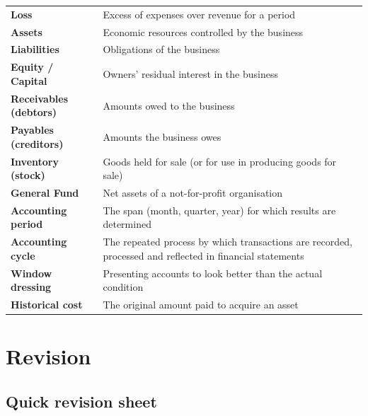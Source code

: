 \documentclass[11pt,a4paper]{article}
\begin{document}
\begin{center}
\begin{tabularx}{\textwidth}{@{}l Y@{}}
\textbf{Loss} & Excess of expenses over revenue for a period\\
\textbf{Assets} & Economic resources controlled by the business\\
\textbf{Liabilities} & Obligations of the business\\
\textbf{Equity / Capital} & Owners' residual interest in the business\\
\textbf{Receivables (debtors)} & Amounts owed to the business\\
\textbf{Payables (creditors)} & Amounts the business owes\\
\textbf{Inventory (stock)} & Goods held for sale (or for use in producing goods for sale)\\
\textbf{General Fund} & Net assets of a not-for-profit organisation\\
\textbf{Accounting period} & The span (month, quarter, year) for which results are determined\\
\textbf{Accounting cycle} & The repeated process by which transactions are recorded, processed and reflected in financial statements\\
\textbf{Window dressing} & Presenting accounts to look better than the actual condition\\
\textbf{Historical cost} & The original amount paid to acquire an asset\\
\bottomrule
\end{tabularx}
\end{center}

\clearpage
\section{Revision}

\subsection{Quick revision sheet}
\end{document}
